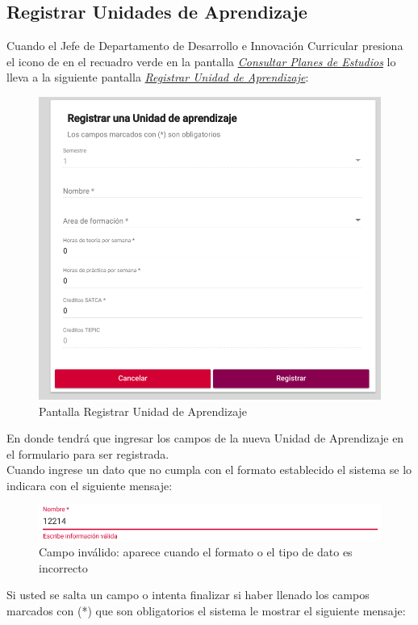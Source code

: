 \subsection{Registrar Unidades de Aprendizaje}
Cuando el Jefe de Departamento de Desarrollo e Innovación Curricular presiona el icono de \IUbutton{+} en el recuadro verde en la pantalla \hyperlink{consultarUA}{\textit{Consultar Planes de Estudios}} lo lleva a la siguiente pantalla \hyperlink{registrarUA}{\textit{Registrar Unidad de Aprendizaje}}:\\
\begin{figure}[H]
    \centering
    \hypertarget{registrarUA}{\includegraphics[width=0.7\linewidth]{images/GUA/registrarUA}}
    \caption{Pantalla Registrar Unidad de Aprendizaje}
    \label{registrarUA}
\end{figure}
\newpage
En donde tendrá que ingresar los campos de la nueva Unidad de Aprendizaje en el formulario para ser registrada.\\
Cuando ingrese un dato que no cumpla con el formato establecido el sistema se lo indicara con el siguiente mensaje:\\
\begin{figure}[H]
    \centering
    \hypertarget{invalidoR}{\includegraphics[width=0.7\linewidth]{images/GUA/invalido}}
    \caption{Campo inválido: aparece cuando el formato o el tipo de dato es incorrecto}
    \label{invalidoR}
\end{figure}
Si usted se salta un campo o intenta finalizar si haber llenado los campos marcados con (*) que son obligatorios el sistema le mostrar el siguiente mensaje:\\
